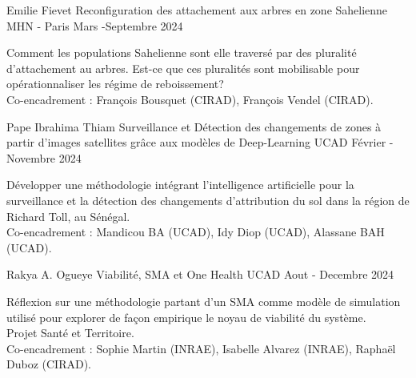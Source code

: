 \vspace{2em}
\vspace{1em}
\begin{cventries}
    \cventry
      {Emilie Fievet} %
      {Reconfiguration des attachement aux arbres en zone Sahelienne} %
      {MHN - Paris} %
      {Mars -Septembre 2024} %
      {
      \begin{cvitems} %
        Comment les populations Sahelienne sont elle traversé par des pluralité d'attachement au arbres. Est-ce que ces pluralités sont mobilisable pour opérationnaliser les régime de reboissement?\\
          Co-encadrement : François Bousquet (CIRAD), François Vendel (CIRAD).
      \end{cvitems}
      }

    \cventry
        {Pape Ibrahima Thiam} %
        {Surveillance et Détection des changements de zones à partir d’images satellites grâce aux modèles de Deep-Learning} %
        {UCAD } %
        {Février - Novembre 2024} %
        {
        \begin{cvitems} %
          Développer une méthodologie intégrant l’intelligence artificielle pour la surveillance et la détection des changements d'attribution du sol dans la région de Richard Toll, au Sénégal.\\
            Co-encadrement : Mandicou BA (UCAD), Idy Diop (UCAD), Alassane BAH (UCAD).
        \end{cvitems}
        }


    \cventry
        {Rakya A. Ogueye} %
        {Viabilité, SMA et One Health} %
        {UCAD } %
        {Aout - Decembre 2024} %
        {
        \begin{cvitems} %
            Réflexion sur une méthodologie partant d’un SMA comme modèle de simulation utilisé pour explorer de façon empirique le noyau de viabilité du système.\\
            Projet Santé et Territoire.\\
            Co-encadrement : Sophie Martin (INRAE), Isabelle Alvarez (INRAE), Raphaël Duboz (CIRAD).
        \end{cvitems}
        }



\end{cventries}
